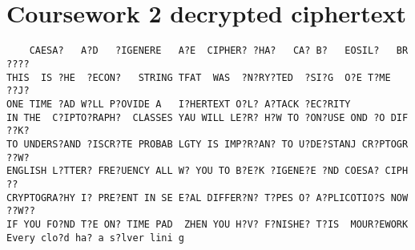 \documentclass{article}
\begin{document}
\section{\\Coursework 2 decrypted ciphertext} \label{App:AppendixB}
\scriptsize
\begin{verbatim}
    CAESA?   A?D   ?IGENERE   A?E  CIPHER? ?HA?   CA? B?   EOSIL?   BR ????
THIS  IS ?HE  ?ECON?   STRING TFAT  WAS  ?N?RY?TED  ?SI?G  O?E T?ME    ??J?
ONE TIME ?AD W?LL P?OVIDE A   I?HERTEXT O?L? A?TACK ?EC?RITY
IN THE  C?IPTO?RAPH?  CLASSES YAU WILL LE?R? H?W TO ?ON?USE OND ?O DIF ??K?
TO UNDERS?AND ?ISCR?TE PROBAB LGTY IS IMP?R?AN? TO U?DE?STANJ CR?PTOGR ??W?
ENGLISH L?TTER? FRE?UENCY ALL W? YOU TO B?E?K ?IGENE?E ?ND COESA? CIPH ??
CRYPTOGRA?HY I? PRE?ENT IN SE E?AL DIFFER?N? T?PES O? A?PLICOTIO?S NOW ??W??
IF YOU FO?ND T?E ON? TIME PAD  ZHEN YOU H?V? F?NISHE? T?IS  MOUR?EWORK
Every clo?d ha? a s?lver lini g
\end{verbatim}
\end{document}
